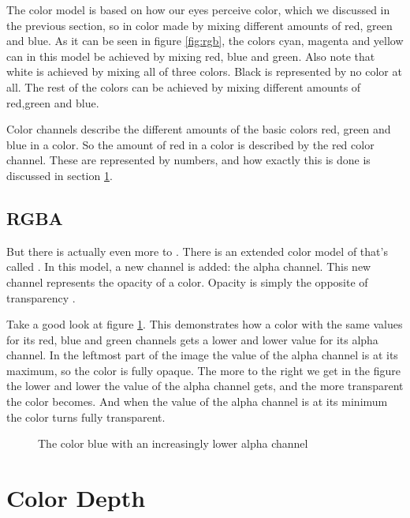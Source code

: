 The \rgb color model is based on how our eyes perceive color, which we
discussed in the previous section, so in \rgb color made by mixing
different amounts of red, green and blue. As it can be seen in figure
\ref{fig:rgb}, the colors cyan, magenta and yellow can in this model
be achieved by mixing red, blue and green. Also note that white is
achieved by mixing all of three colors. Black is represented by no
color at all. The rest of the colors can be achieved by mixing
different amounts of red,green and blue.

Color channels describe the different amounts of the basic colors red,
green and blue in a color. So the amount of red in a color is
described by the red color channel. These are represented by numbers,
and how exactly this is done is discussed in section
\ref{sec:color-depth}.

\subsection{RGBA}


But there is actually even more to \rgb. There is an extended color
model of \rgb that's called \rgba. In this model, a new channel is
added: the alpha channel. This new channel
represents the opacity of a color. Opacity is simply the opposite of
transparency \cite{porter84_compos_dig_img,murray1996encyclopedia,niederst1999webdesign}.

Take a good look at figure \ref{fig:alpha}. This demonstrates how a
color with the same values for its red, blue and green channels gets a
lower and lower value for its alpha channel. In the leftmost part of
the image the value of the alpha channel is at its maximum, so the
color is fully opaque. The more to the right we get in the figure the
lower and lower the value of the alpha channel gets, and the more
transparent the color becomes. And when the value of the alpha channel
is at its minimum the color turns fully transparent.

\begin{figure}
  \centering
  \caption{The color blue with an increasingly lower alpha channel}
  \label{fig:alpha}
\end{figure}

\newcommand{\rgbtrip}[3]{\mbox{(#1,#2,#3)}}

\section{Color Depth}
\label{sec:color-depth}

